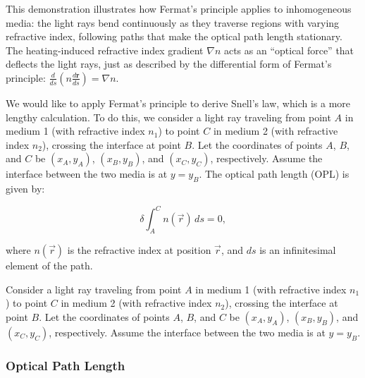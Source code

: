 \documentclass[
  a4paper,
]{book}
\begin{document}
This demonstration illustrates how Fermat's principle applies to
inhomogeneous media: the light rays bend continuously as they traverse
regions with varying refractive index, following paths that make the
optical path length stationary. The heating-induced refractive index
gradient \(\nabla n\) acts as an ``optical force'' that deflects the
light rays, just as described by the differential form of Fermat's
principle:
\(\frac{d}{ds}\left(n\frac{d\mathbf{r}}{ds}\right) = \nabla n\).

\begin{tcolorbox}[enhanced jigsaw, breakable, toptitle=1mm, bottomrule=.15mm, colbacktitle=quarto-callout-tip-color!10!white, title=\textcolor{quarto-callout-tip-color}{\faLightbulb}\hspace{0.5em}{Fermat's Principle and Snells Law}, arc=.35mm, rightrule=.15mm, bottomtitle=1mm, opacityback=0, toprule=.15mm, coltitle=black, leftrule=.75mm, opacitybacktitle=0.6, colback=white, left=2mm, titlerule=0mm, colframe=quarto-callout-tip-color-frame]

We would like to apply Fermat's principle to derive Snell's law, which
is a more lengthy calculation. To do this, we consider a light ray
traveling from point \(A\) in medium 1 (with refractive index \(n_1\))
to point \(C\) in medium 2 (with refractive index \(n_2\)), crossing the
interface at point \(B\). Let the coordinates of points \(A\), \(B\),
and \(C\) be \((x_A, y_A)\), \((x_B, y_B)\), and \((x_C, y_C)\),
respectively. Assume the interface between the two media is at
\(y = y_B\). The optical path length (OPL) is given by:

\[
\delta \int_{A}^{C} n(\vec{r}) \, ds = 0,
\]

where \(n(\vec{r})\) is the refractive index at position \(\vec{r}\),
and \(ds\) is an infinitesimal element of the path.

Consider a light ray traveling from point \(A\) in medium 1 (with
refractive index \(n_1\)) to point \(C\) in medium 2 (with refractive
index \(n_2\)), crossing the interface at point \(B\). Let the
coordinates of points \(A\), \(B\), and \(C\) be \((x_A, y_A)\),
\((x_B, y_B)\), and \((x_C, y_C)\), respectively. Assume the interface
between the two media is at \(y = y_B\).

\subsubsection{Optical Path Length}\label{optical-path-length}


\end{tcolorbox}
\end{document}
